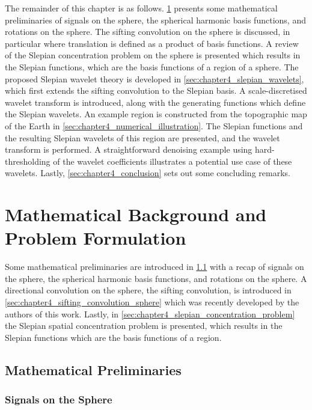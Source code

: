 The remainder of this chapter is as follows.
\cref{sec:chapter4_mathematical_background_problem_formulation} presents some mathematical preliminaries of signals on the sphere, the spherical harmonic basis functions, and rotations on the sphere.
The sifting convolution on the sphere is discussed, in particular where translation is defined as a product of basis functions.
A review of the Slepian concentration problem on the sphere is presented which results in the Slepian functions, which are the basis functions of a region of a sphere.
The proposed Slepian wavelet theory is developed in \cref{sec:chapter4_slepian_wavelets}, which first extends the sifting convolution to the Slepian basis.
A scale-discretised wavelet transform is introduced, along with the generating functions which define the Slepian wavelets.
An example region is constructed from the topographic map of the Earth in \cref{sec:chapter4_numerical_illustration}.
The Slepian functions and the resulting Slepian wavelets of this region are presented, and the wavelet transform is performed.
A straightforward denoising example using hard-thresholding of the wavelet coefficients illustrates a potential use case of these wavelets.
Lastly, \cref{sec:chapter4_conclusion} sets out some concluding remarks.

\section{Mathematical Background and Problem Formulation}\label{sec:chapter4_mathematical_background_problem_formulation}

Some mathematical preliminaries are introduced in \cref{sec:chapter4_mathematical_preliminaries} with a recap of signals on the sphere, the spherical harmonic basis functions, and rotations on the sphere.
A directional convolution on the sphere, the sifting convolution, is introduced in \cref{sec:chapter4_sifting_convolution_sphere} which was recently developed by the authors of this work.
Lastly, in \cref{sec:chapter4_slepian_concentration_problem} the Slepian spatial concentration problem is presented, which results in the Slepian functions which are the basis functions of a region.

\subsection{Mathematical Preliminaries}\label{sec:chapter4_mathematical_preliminaries}

\subsubsection{Signals on the Sphere}

